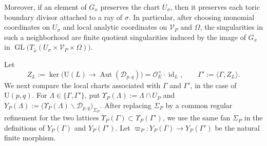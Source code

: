 \documentclass[11pt]{amsart}
\theoremstyle{plain}
\theoremstyle{definition}
\numberwithin{equation}{section}
\def\id{\mathop{\mathrm{id}}\nolimits}
\def\Aut{\mathop{\mathrm{Aut}}\nolimits}
\def\GL{\mathop{\mathrm{GL}}\nolimits}
\def\OO{\mathscr{O}}
\def\U{\mathrm{U}}
\begin{document}
    Moreover, if an element of $G_x$ preserves the chart $U_\sigma$, then it preserves each toric boundary divisor attached to a ray of $\sigma$. In particular, after choosing monomial coordinates on $U_\sigma$ and local analytic coordinates on $\mathcal V_P$ and $\Omega$, the singularities in such a neighborhood are finite quotient singularities induced by the image of $G_x$ in
    $\GL\bigl(T_{\tilde{x}}(U_\sigma\times\mathcal V_P\times\Omega)\bigr)$.

Let
\[
  Z_L
  :=
  \ker\bigl(\U(L)\to \Aut(\mathcal{D}_{p,q})\bigr)
  =
  \OO_E^\times\cdot\id_L,
  \qquad
  \Gamma':=\langle\Gamma,Z_L\rangle.
\]
        We next compare the local charts associated with $\Gamma$ and $\Gamma'$, in the case of $\U(p,q)$.
For $\Lambda\in\{\Gamma,\Gamma'\}$, put $\Upsilon_P(\Lambda):=\Lambda\cap U_P$
and $Y_P(\Lambda)
  :=
  \bigl(
    \Upsilon_P(\Lambda)\backslash\mathcal{D}_{p,q}
  \bigr)_{\Sigma_P}$.
After replacing $\Sigma_P$ by a common
regular refinement for the two lattices $\Upsilon_P(\Gamma)\subset\Upsilon_P(\Gamma')$,
we use the same fan $\Sigma_P$ in the definitions of
$Y_P(\Gamma)$ and $Y_P(\Gamma')$.
Let $\varpi_P:Y_P(\Gamma)\to Y_P(\Gamma')$
be the natural finite morphism. 
\end{document}
